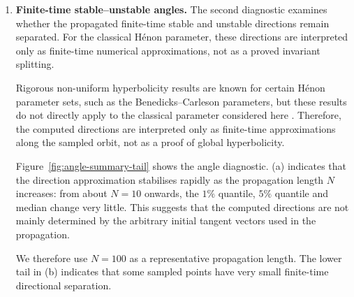 \begin{enumerate}
     Thus the finite-time exponents indicate: local stretching is non-uniform over short windows, while the averaged expansion rate stabilises near a positive value. Together with \( \lambda_1^{(n)}(z)+\lambda_2^{(n)}(z)=\log 0.3<0,\)
    this supports the expected dissipative stretching mechanism of the Hénon attractor: one tangent direction expands on average, while the total area is contracted.

    


    \item \textbf{Finite-time stable--unstable angles.}
    The second diagnostic examines whether the propagated finite-time stable and unstable directions remain separated. For the classical Hénon parameter, these directions are interpreted only as finite-time numerical approximations, not as a proved invariant splitting.

    Rigorous non-uniform hyperbolicity results are known for certain Hénon parameter sets, such as the Benedicks--Carleson parameters, but these results do not directly apply to the classical parameter considered here \cite{BenedicksCarleson1991, GaliasTucker2015}. Therefore, the computed directions are interpreted only as finite-time approximations along the sampled orbit, not as a proof of global hyperbolicity.

    
    
    Figure~\ref{fig:angle-summary-tail} shows the angle diagnostic. (a) indicates that the direction approximation stabilises rapidly as the propagation length \(N\) increases: from about \(N=10\) onwards, the \(1\%\) quantile, \(5\%\) quantile and median change very little. This suggests that the computed directions are not mainly determined by the arbitrary initial tangent vectors used in the propagation.
    
    We therefore use \(N=100\) as a representative propagation length. The lower tail in (b) indicates that some sampled points have very small finite-time directional separation.

       
 \begin{figure}[H]
    \centering


\end{figure}
\end{enumerate}
